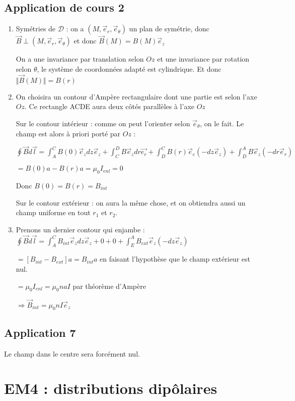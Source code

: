 \documentclass[a4paper,12pt]{book}
\begin{document}
\subsection{Application de cours 2}
\begin{enumerate}
\item Symétries de $\mathcal{D}$ : on a $(M,\vec{e}_r,\vec{e}_\theta)$ un plan de symétrie, donc $\vec{B}\perp(M,\vec{e}_r,\vec{e}_\theta)$ et donc $\vec{B}(M)=B(M)\vec{e}_z$
\par On a une invariance par translation selon $Oz$ et une invariance par rotation selon $\theta$, le système de coordonnées adapté est cylindrique. Et donc $\Vert\vec{B}(M)\Vert=B(r)$
\item On choisira un contour d'Ampère rectangulaire dont une partie est selon l'axe $Oz$. Ce rectangle ACDE aura deux côtés parallèles à l'axe $Oz$
\par Sur le contour intérieur : comme on peut l'orienter selon $\vec{e}_\theta$, on le fait. Le champ est alors à priori porté par $Oz$ : \par $\oint\vec{B}d\vec{l}=\int_A^CB(0)\vec{e}_zdz\vec{e}_z+\int_C^DB\vec{e}_zdr\vec{e_r}+\int_D^CB(r)\vec{e}_e(-dz\vec{e}_z) + \int_D^AB\vec{e}_z(-dr\vec{e}_r)$ \par $=B(0)a - B(r)a =\mu_0I_{enl}=0$ \par Donc $B(0)=B(r)=B_{int}$
\par Sur le contour extérieur : on aura la même chose, et on obtiendra aussi un champ uniforme en tout $r_1$ et $r_2$.
\item Prenons un dernier contour qui enjambe : $\oint\vec{B}d\vec{l}=\int_A^CB_{int}\vec{e}_zdz\vec{e}_z+0+0+\int_E^AB_{ext}\vec{e}_z(-dz\vec{e}_z)$ \par$ = \left[B_{int}-B_{ext}\right]a = B_{int}a$ en faisant l'hypothèse que le champ extérieur est nul. \par $= \mu_0I_{enl}=\mu_0naI$ par théorème d'Ampère \par $\Rightarrow \vec{B}_{int} =\mu_0nI\vec{e}_z$
\end{enumerate}

\subsection{Application 7}
Le champ dans le centre sera forcément nul.


\section{EM4 : distributions dipôlaires}
\end{document}
